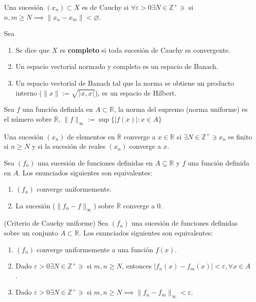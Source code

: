 \begin{definicion}
	Una sucesión $(x_n)\subset X$ es de Cauchy si $\forall \varepsilon >0\exists N\in \mathbb{Z}^+\ni$ si $n,m\geq N\implies \|x_n-x_m\|<\varnothing$. 
\end{definicion}

\begin{definicion}
	Sea
	\begin{enumerate}
		\item Se dice que $X$ es \textbf{completo} si toda sucesión de Cauchy es convergente. 
		\item Un espacio vectorial normado y completo es un espacio de Banach. 
		\item Un espacio vectorial de Banach tal que la norma se obtiene un producto interno ($\|x\|:=\sqrt{\rangle x, x\langle}$), es un espacio de Hilbert. 
		\end{enumerate}
\end{definicion}

\begin{definicion}
	Sea $f$ una función definida en $A\subset \mathbb{R}$, la norma del supremo (norma uniforme) es el número sobre $\overline{\mathbb{R}}$, $\|f\|_\infty:= \sup\{|f(x)|:x\in A\}$
\end{definicion}

\begin{nota}
	Una sucesión $(x_n)$ de elementos en $\overline{\mathbb{R}}$ converge a $x\in\mathbb{R}$ si $\exists N\in\mathbb{Z}^+\ni x_n$ es finito si $n\geq N$ y si la sucesión de reales $(x_n)$ converge a $x$. 
\end{nota}

\begin{prop}
	Sea $(f_n)$ una sucesión de funciones definidas en $A\subseteq \mathbb{R}$ y $f$ una función definida en $A$. Los enunciados siguientes son equivalentes:
	\begin{enumerate}
		\item $(f_n)$ converge uniformemente. 
		\item La sucesión ($\|f_n-f\|_\infty$) sobre $\overline{\mathbb{R}}$ converge a 0. 
	\end{enumerate}
\end{prop}

\begin{teorema}(Criterio de Cauchy uniforme)
	Sea $(f_n)$ una sucesión de funciones definidas sobre un conjunto $A\subset \mathbb{R}$. Los enunciados siguientes son equivalentes: 
	\begin{enumerate}
		\item $(f_n)$ converge uniformemente a una función $f(x)$.
		\item Dado $\varepsilon>0\exists N\in\mathbb{Z}^+\ni$ si $m,n\geq N$, entonces $|f_n(x)-f_m(x)|<\varepsilon, \forall x\in A$. 
		\item Dado $\varepsilon>0\exists N\in\mathbb{Z}^+\ni$ si $m,n\geq N\implies \|f_n-f_m\|_\infty<\varepsilon$. 
	\end{enumerate}
\end{teorema}


